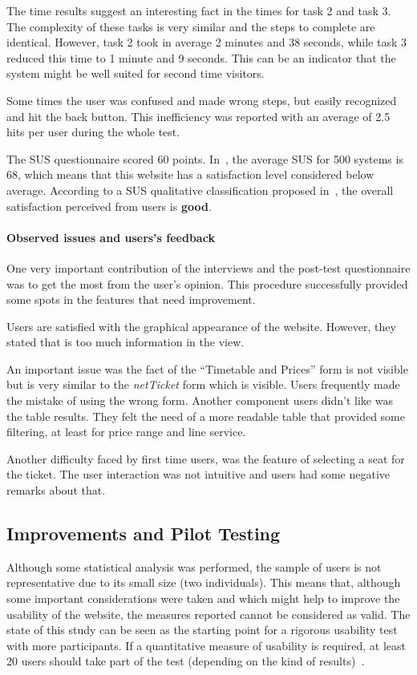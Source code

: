 \documentclass[a4paper]{article}
\begin{document}
The time results suggest an interesting fact in the times for task 2 and task 3. The complexity of these tasks is very similar and the steps to complete are identical. However, task 2 took in average 2 minutes and 38 seconds, while task 3 reduced this time to 1 minute and 9 seconds. This can be an indicator that the system might be well suited for second time visitors.

Some times the user was confused and made wrong steps, but easily recognized and hit the back button. This inefficiency was reported with an average of 2.5 hits per user during the whole test.

The SUS questionnaire scored 60 points. In~\citep{sauro2011measuring}, the average SUS for 500 systems is 68, which means that this website has a satisfaction level considered below average. According to a SUS qualitative classification proposed in~\citep{bangor2009determining}, the overall satisfaction perceived from users is \textbf{good}.

\paragraph{Observed issues and users's feedback}
One very important contribution of the interviews and the post-test questionnaire was to get the most from the user's opinion. This procedure successfully provided some spots in the features that need improvement. 

Users are satisfied with the graphical appearance of the website. However, they stated that is too much information in the view.

An important issue was the fact of the ``Timetable and Prices'' form is not visible but is very similar to the \emph{netTicket} form which is visible. Users frequently made the mistake of using the wrong form. Another component users didn't like was the table results. They felt the need of a more readable table that provided some filtering, at least for price range and line service.

Another difficulty faced by first time users, was the feature of selecting a seat for the ticket. The user interaction was not intuitive and users had some negative remarks about that.

\subsection{Improvements and Pilot Testing}

Although some statistical analysis was performed, the sample of users is not representative due to its small size (two individuals).
This means that, although some important considerations were taken and which might help to improve the usability of the website, the measures reported cannot be considered as valid. 
The state of this study can be seen as the starting point for a rigorous usability test with more participants. If a quantitative measure of usability is required, at least 20 users should take part of the test (depending on the kind of results)~\citep{nielsen2012many}.
\end{document}

